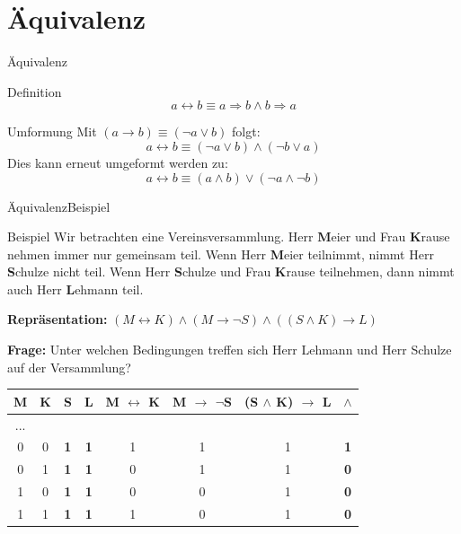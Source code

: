 \documentclass[xelatex,aspectratio=169]{beamer}
\begin{document}
\section{Äquivalenz}

\begin{frame}{Äquivalenz}
  \begin{block}{Definition}
    \[ a \leftrightarrow b \equiv a \Rightarrow b \land b \Rightarrow a \]
  \end{block}
  \begin{block}{Umformung}
    Mit \( (a \rightarrow b ) \equiv (\lnot a \lor b) \) folgt:
    \[ a \leftrightarrow b \equiv (\lnot a \lor b) \land (\lnot b \lor a) \]
    Dies kann erneut umgeformt werden zu:
    \[ a \leftrightarrow b \equiv (a \land b) \lor (\lnot a \land \lnot b) \]
  \end{block}
\end{frame}

\begin{frame}{Äquivalenz}{Beispiel}
  \begin{exampleblock}{Beispiel}
    Wir betrachten eine Vereinsversammlung. Herr \textbf{M}eier und Frau \textbf{K}rause nehmen immer nur gemeinsam teil.
    Wenn Herr \textbf{M}eier teilnimmt, nimmt Herr \textbf{S}chulze nicht teil.
    Wenn Herr \textbf{S}chulze und Frau \textbf{K}rause teilnehmen, dann nimmt auch Herr \textbf{L}ehmann teil.

    \textbf{Repräsentation:} \( (M \leftrightarrow K) \land (M \rightarrow \lnot S) \land ((S \land K) \rightarrow L) \)

    \textbf{Frage:} Unter welchen Bedingungen treffen sich Herr Lehmann und Herr Schulze auf der Versammlung?

    \centering
    \small
    \begin{tabular}{cccccccc}
      \toprule
      M & K & S          & L          & M $\leftrightarrow$ K & M $\rightarrow$ $\lnot$S & (S $\land$ K) $\rightarrow$ L & $\land$    \\
      \midrule
      ...                                                                                                                             \\
      0 & 0 & \textbf{1} & \textbf{1} & 1                     & 1                        & 1                             & \textbf{1} \\
      0 & 1 & \textbf{1} & \textbf{1} & 0                     & 1                        & 1                             & \textbf{0} \\
      1 & 0 & \textbf{1} & \textbf{1} & 0                     & 0                        & 1                             & \textbf{0} \\
      1 & 1 & \textbf{1} & \textbf{1} & 1                     & 0                        & 1                             & \textbf{0} \\
      \bottomrule
    \end{tabular}

  \end{exampleblock}
\end{frame}

\end{document}
